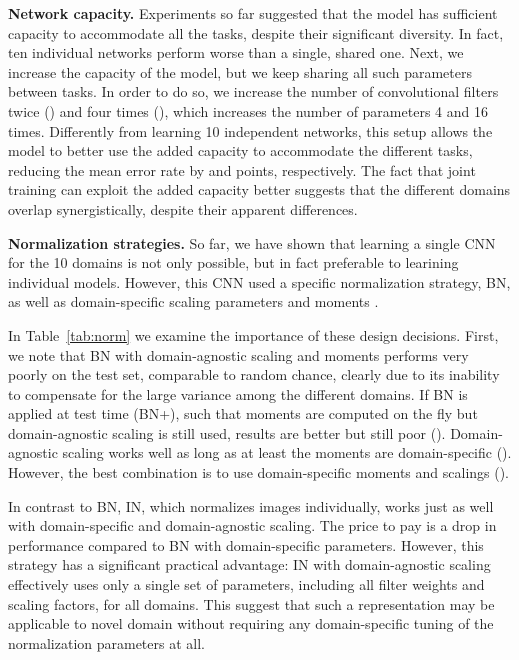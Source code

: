 \documentclass[10pt,twocolumn,letterpaper]{article}
\renewcommand{\paragraph}[1]{\par\medskip\noindent\textbf{#1}}
\begin{document}
\paragraph{Network capacity.} Experiments so far suggested that the model has sufficient capacity to accommodate all the tasks, despite their significant diversity. In fact, ten individual networks perform worse than a single, shared one. Next, we increase the capacity of the model, but we keep sharing all such parameters between tasks. In order to do so, we increase the number of convolutional filters twice () and four times (), which increases the number of parameters 4 and 16 times. Differently from learning 10 independent networks, this setup allows the model to better use the added capacity to accommodate the different tasks, reducing the mean error rate by  and  points, respectively. The fact that joint training can exploit the added capacity better suggests that the different domains overlap synergistically, despite their apparent differences.

\paragraph{Normalization strategies.} So far, we have shown that learning a single CNN for the 10 domains is not only possible, but in fact preferable to learining individual models. However, this CNN used a specific normalization strategy, BN, as well as domain-specific scaling parameters  and moments .

In Table~\ref{tab:norm} we examine the importance of these design decisions. First, we note that BN with domain-agnostic scaling  and moments  performs very poorly on the test set, comparable to random chance, clearly due to its inability to compensate for the large variance among the different domains. If BN is applied at test time (BN+), such that moments are computed on the fly but domain-agnostic scaling is still used, results are better but still poor (). Domain-agnostic scaling works well as long as at least the moments are domain-specific (). However, the best combination is to use domain-specific moments and scalings ().


In contrast to BN, IN, which normalizes images individually, works just as well with domain-specific and domain-agnostic scaling. The price to pay is a  drop in performance compared to BN with domain-specific parameters. However, this strategy has a significant practical advantage: IN with domain-agnostic scaling effectively uses only a single set of parameters, including all filter weights and scaling factors, for all domains. This suggest that such a representation may be applicable to novel domain without requiring any domain-specific tuning of the normalization parameters at all.
\end{document}
